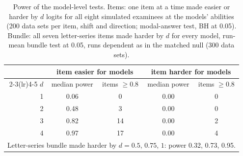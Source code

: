 \begin{table}[t]
\caption{Power of the model-level tests. Items: one item at a time made easier or harder by $d$ logits for all eight simulated examinees at the models' abilities (200 data sets per item, shift and direction; modal-answer test, BH at 0.05). Bundle: all seven letter-series items made harder by $d$ for every model, run-mean bundle test at 0.05, runs dependent as in the matched null (300 data sets).}
\label{tab:power2}\centering\footnotesize\setlength{\tabcolsep}{4pt}
\begin{tabular}{rcccc}\toprule
 & \multicolumn{2}{c}{item easier for models} & \multicolumn{2}{c}{item harder for models} \\\cmidrule(lr){2-3}\cmidrule(lr){4-5}
$d$ & median power & items $\ge0.8$ & median power & items $\ge0.8$ \\\midrule
1 & 0.06 & 0 & 0.00 & 0 \\
2 & 0.48 & 3 & 0.00 & 0 \\
3 & 0.82 & 14 & 0.00 & 2 \\
4 & 0.97 & 17 & 0.00 & 4 \\
\midrule
\multicolumn{5}{p{0.86\columnwidth}}{Letter-series bundle made harder by $d=0.5$, $0.75$, $1$: power 0.32, 0.73, 0.95.} \\
\bottomrule\end{tabular}\end{table}
